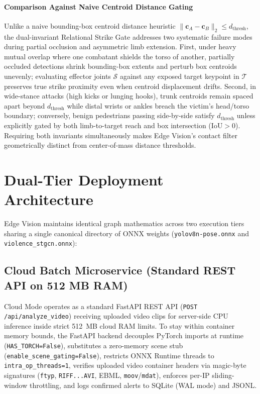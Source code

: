 \documentclass[conference]{IEEEtran}
\begin{document}
\paragraph*{Comparison Against Naive Centroid Distance Gating}
Unlike a naive bounding-box centroid distance heuristic $\|\mathbf{c}_A - \mathbf{c}_B\|_2 \le d_{\text{thresh}}$, the dual-invariant Relational Strike Gate addresses two systematic failure modes during partial occlusion and asymmetric limb extension. First, under heavy mutual overlap where one combatant shields the torso of another, partially occluded detections shrink bounding-box extents and perturb box centroids unevenly; evaluating effector joints $\mathcal{S}$ against any exposed target keypoint in $\mathcal{T}$ preserves true strike proximity even when centroid displacement drifts. Second, in wide-stance attacks (high kicks or lunging hooks), trunk centroids remain spaced apart beyond $d_{\text{thresh}}$ while distal wrists or ankles breach the victim's head/torso boundary; conversely, benign pedestrians passing side-by-side satisfy $d_{\text{thresh}}$ unless explicitly gated by both limb-to-target reach and box intersection ($\text{IoU} > 0$). Requiring both invariants simultaneously makes Edge Vision's contact filter geometrically distinct from center-of-mass distance thresholds.

\section{Dual-Tier Deployment Architecture}
Edge Vision maintains identical graph mathematics across two execution tiers sharing a single canonical directory of ONNX weights (\texttt{yolov8n-pose.onnx} and \texttt{violence\_stgcn.onnx}):

\subsection{Cloud Batch Microservice (Standard REST API on 512 MB RAM)}
Cloud Mode operates as a standard FastAPI REST API (\texttt{POST /api/analyze\_video}) receiving uploaded video clips for server-side CPU inference inside strict 512~MB cloud RAM limits. To stay within container memory bounds, the FastAPI backend decouples PyTorch imports at runtime (\texttt{HAS\_TORCH=False}), substitutes a zero-memory scene stub (\texttt{enable\_scene\_gating=False}), restricts ONNX Runtime threads to \texttt{intra\_op\_threads=1}, verifies uploaded video container headers via magic-byte signatures (\texttt{ftyp}, \texttt{RIFF...AVI}, EBML, \texttt{moov}/\texttt{mdat}), enforces per-IP sliding-window throttling, and logs confirmed alerts to SQLite (WAL mode) and JSONL.
\end{document}
